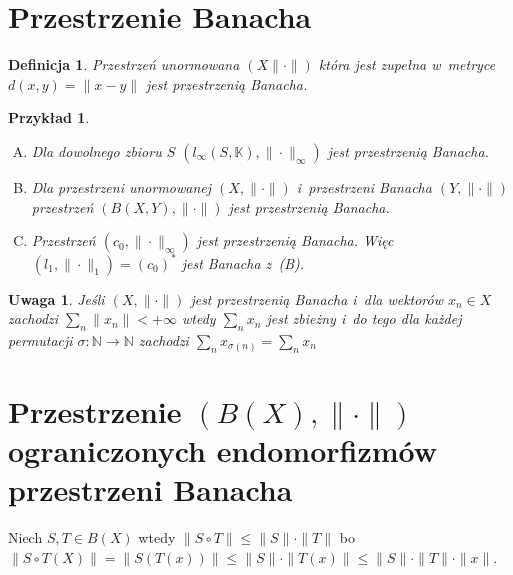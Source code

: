 \documentclass[11pt]{mwrep}
\renewcommand{\[}{\begin{equation}}
\renewcommand{\]}{\end{equation}}
\newcommand{\N}{{\ensuremath{\mathbb N}}}
\newcommand{\K}{\ensuremath{\mathbb{K}}}
\newcommand{\norm}{\|\cdot\|}
\newtheorem{uwaga}[subsection]{Uwaga}
\newtheorem{de}[subsection]{Definicja}
\newtheorem{ex}[subsection]{Przykład}
\newcounter{numer}
\begin{document}
\section{Przestrzenie Banacha}
\begin{de}
	Przestrzeń unormowana $(X\norm )$ która jest zupełna w~metryce $d(x,y) = \|x- y\|$ jest przestrzenią Banacha.
\end{de}
\begin{ex}
	\begin{enumerate}[(A)]
		\item Dla dowolnego zbioru $S$ $\left( l_\infty(S,\K),\norm_\infty \right)$ jest przestrzenią Banacha. 
		\item Dla przestrzeni unormowanej  $(X,\norm)$ i~przestrzeni Banacha $(Y,\norm)$ przestrzeń $\left( B(X,Y), \norm \right)$ 
			jest przestrzenią Banacha.
		\item Przestrzeń $(c_0, \norm_\infty)$ jest przestrzenią Banacha. Więc $(l_1,\norm_1)= (c_0)^*$ jest Banacha  z~(B).
	\end{enumerate}
\end{ex}
\begin{uwaga}
	Jeśli $(X,\norm)$ jest przestrzenią Banacha i~dla wektorów $x_n \in X$ zachodzi $\sum_n \|x_n\| < +\infty$ wtedy 
	$\sum_n x_n$ jest zbieżny i~do tego dla każdej permutacji $\sigma\colon \N\to\N$ zachodzi $\sum_n x_{\sigma(n)} = \sum_n x_n$
\end{uwaga}
\section{Przestrzenie $(B(X),\norm)$ ograniczonych endomorfizmów przestrzeni Banacha}
Niech $S,T \in B(X)$ wtedy $\|S\circ T\| \le \|S\| \cdot \|T\|$ bo 
$\|S\circ T (X) \|= \| S(T(x))\| \le \|S\|\cdot \|T(x)\| \le \|S\| \cdot \|T\| \cdot \|x\|$.
\end{document}
